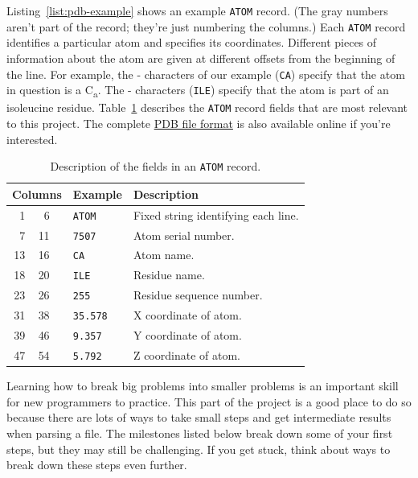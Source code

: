 \documentclass{article}
\newcommand{\calpha}{C\textsubscript{\textgreek{a}}}
\newcommand{\atomrec}{\texttt{ATOM} record}
\begin{document}
Listing~\ref{list:pdb-example} shows an example \atomrec{}.  (The gray numbers 
aren't part of the record; they're just numbering the columns.)  Each 
\atomrec{} identifies a particular atom and specifies its coordinates.  
Different pieces of information about the atom are given at different offsets 
from the beginning of the line.  For example, the  -  
characters of our example (\texttt{CA}) specify that the atom in question is a 
\calpha{}.  The  -  characters (\texttt{ILE}) specify that the 
atom is part of an isoleucine residue.
Table~\ref{tab:pdb-atom-record} describes the \atomrec{} fields that are most 
relevant to this project.  The complete 
\href{http://www.wwpdb.org/documentation/format33/v3.3.html}{PDB file format} 
is also available online if you're interested.

\begin{table}[h]
\centering
\begin{tabular}{r@{ - }rcll}
\toprule
\multicolumn{3}{l}{Columns} & Example         & Description                         \\
\midrule
 1 &  6 & & \texttt{ATOM}   & Fixed string identifying each line. \\
 7 & 11 & & \texttt{7507}   & Atom serial number.                 \\
13 & 16 & & \texttt{CA}     & Atom name.                          \\
18 & 20 & & \texttt{ILE}    & Residue name.                       \\
23 & 26 & & \texttt{255}    & Residue sequence number.            \\
31 & 38 & & \texttt{35.578} & X coordinate of atom.               \\
39 & 46 & & \texttt{9.357}  & Y coordinate of atom.               \\
47 & 54 & & \texttt{5.792}  & Z coordinate of atom.               \\
\bottomrule
\end{tabular}
\caption{Description of the fields in an \texttt{ATOM} record.}
\label{tab:pdb-atom-record}
\end{table}

Learning how to break big problems into smaller problems is an important skill 
for new programmers to practice.  This part of the project is a good place to 
do so because there are lots of ways to take small steps and get intermediate 
results when parsing a file.  The milestones listed below break down some of 
your first steps, but they may still be challenging.  If you get stuck, think 
about ways to break down these steps even further.
\end{document}
